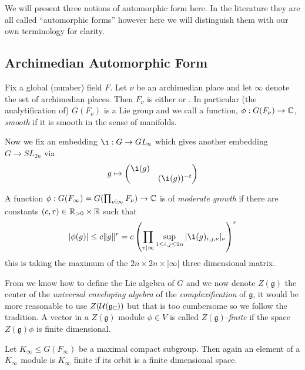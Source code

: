 We will present three notions of automorphic form here. In the literature they are all called ``automorphic forms'' however here we will distinguish them with our own terminology for clarity.

\subsection{Archimedian Automorphic Form}
Fix a global (number) field \(F\). Let \(\nu\) be an archimedian place and let \(\infty\) denote the set of archimedian places. Then \(F_\nu\) is either \R or \C. In particular (the analytification of) \(G(F_\nu)\) is a Lie group and we call a function, \(\phi: G(F_\nu) \to \C\), \textit{smooth}  if it is smooth in the sense of manifolds.


Now we fix an embedding \(\i : G\to GL_n\) which gives another embedding \(G\to SL_{2n}\) via
	\[g\mapsto \begin{pmatrix}
		\i (g) & \\
		 & (\i (g))^{-t}
	\end{pmatrix}\]

	A function \(\phi : G(F_\infty) = G(\prod_{v|\infty} F_\nu) \to \C \) is of \textit{moderate growth} if there are constants \((c,r)\in \R_{>0}\times \R\) such that 
	\[|\phi(g)| \leq c\norm{g}^r = c \left(\prod_{v|\infty} \sup_{1\leq i, j\leq 2n} |\i (g)_{i,j, \nu}|_\nu\right)^r\]
	this is taking the maximum of the \(2n\times 2n \times |\infty| \) three dimensional matrix. 


    From  we know how to define the Lie algebra of \(G\) and we now denote \(Z(\mathfrak{g})\) the center of the \textit{universal enveloping algebra} of the \textit{complexification} of \(\mathfrak{g}\), it would be more reasonable to use \(Z(\mathcal{U}(\mathfrak{g}_{\C}))\) but that is too cumbersome so we follow the tradition. 
    A vector in a \(Z(\mathfrak{g})\) module \(\phi\in V\) is called \(Z(\mathfrak{g})\)-\textit{finite} if the space \(Z(\mathfrak{g})\phi\) is finite dimensional. 

	Let \(K_\infty\leq G(F_\infty)\) be a maximal compact subgroup. Then again an element of a \(K_\infty\) module is \(K_\infty\) finite if its orbit is a finite dimensional  space.

